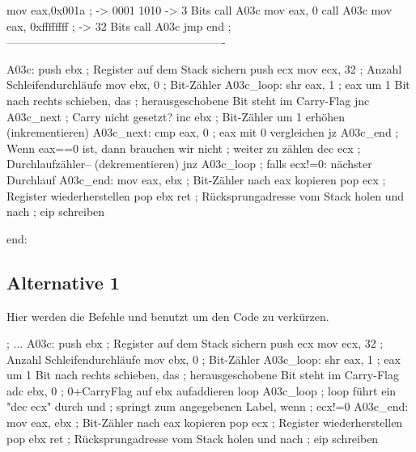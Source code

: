 \begin{minipage}[t]{1\columnwidth}%
\begin{nasmcode}
mov eax,0x001a ; -> 0001 1010 -> 3 Bits
call A03c
mov eax, 0
call A03c
mov eax, 0xffffffff ; -> 32 Bits
call A03c
jmp end
;----------------------------------------------------------

A03c:
  push ebx ; Register auf dem Stack sichern
  push ecx
  mov ecx, 32 ; Anzahl Schleifendurchläufe
  mov ebx, 0 ; Bit-Zähler
A03c_loop:
  shr eax, 1 ; eax um 1 Bit nach rechts schieben, das
             ; herausgeschobene Bit steht im Carry-Flag
  jnc A03c_next ; Carry nicht gesetzt?
  inc ebx ; Bit-Zähler um 1 erhöhen (inkrementieren)
A03c_next:
  cmp eax, 0 ; eax mit 0 vergleichen
  jz A03c_end ; Wenn eax==0 ist, dann brauchen wir nicht
              ; weiter zu zählen
  dec ecx ; Durchlaufzähler-- (dekrementieren)
  jnz A03c_loop ; falls ecx!=0: nächster Durchlauf
A03c_end:
  mov eax, ebx ; Bit-Zähler nach eax kopieren
  pop ecx ; Register wiederherstellen
  pop ebx
  ret ; Rücksprungadresse vom Stack holen und nach
      ; eip schreiben

end:
\end{nasmcode}
\end{minipage}

\vfill{}



\subsection{Alternative 1}

\begin{minipage}[t]{1\columnwidth}%
Hier werden die Befehle  und  benutzt um den Code zu verkürzen.

\begin{nasmcode}
; ...
A03c:
  push ebx ; Register auf dem Stack sichern
  push ecx
  mov ecx, 32 ; Anzahl Schleifendurchläufe
  mov ebx, 0 ; Bit-Zähler
A03c_loop:
  shr eax, 1 ; eax um 1 Bit nach rechts schieben, das
             ; herausgeschobene Bit steht im Carry-Flag
  adc ebx, 0 ; 0+CarryFlag auf ebx aufaddieren
  loop A03c_loop ; loop führt ein "dec ecx" durch und
                 ; springt zum angegebenen Label, wenn
                 ; ecx!=0
A03c_end:
 mov eax, ebx ; Bit-Zähler nach eax kopieren
 pop ecx ; Register wiederherstellen
 pop ebx
 ret ; Rücksprungadresse vom Stack holen und nach
     ; eip schreiben
\end{nasmcode}
\end{minipage}

